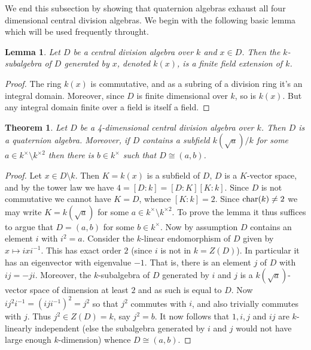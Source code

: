 \documentclass[11pt]{amsart}
\numberwithin{equation}{section}
\newtheorem{theorem}[equation]{Theorem}
\newtheorem{lemma}[equation]{Lemma}
\theoremstyle{remark}
\theoremstyle{remark}
\theoremstyle{remark}
\theoremstyle{definition}
\theoremstyle{definition}
\theoremstyle{definition}
\theoremstyle{definition}
\theoremstyle{definition}
\theoremstyle{definition}
\begin{document}
We end this subsection by showing that quaternion algebras exhaust all four dimensional central division algebras. We begin with the following basic lemma which will be used frequently throught.

\begin{lemma} \label{subfield}
Let $D$ be a central division algebra over $k$ and $ x\in D$. Then the $k$-subalgebra of $D$ generated by $x$, denoted $k(x)$, is a finite field extension of $k$.
\end{lemma}

\begin{proof}
The ring $k(x)$ is commutative, and as a subring of a division ring it's an integral domain. Moreover, since $D$ is finite dimensional over $k$, so is $k(x)$. But any integral domain finite over a field is itself a field.
\end{proof}

\begin{theorem} \label{4 dim div alg}
Let $D$ be a 4-dimensional central division algebra over $k$. Then $D$ is a quaternion algebra. Moreover, if $D$ contains a subfield $k(\sqrt{a})/k$ for some $a\in k^{\times}\setminus k^{\times2}$ then there is $b\in k^{\times}$ such that $D\cong (a,b)$.
\end{theorem}

\begin{proof}
Let $x\in D\setminus k$. Then $K=k(x)$ is a subfield of $D$, $D$ is a $K$-vector space, and by the tower law we have $4=[D:k]=[D:K][K:k]$. Since $D$ is not commutative we cannot have $K=D$, whence $[K:k]=2$. Since $\textup{char}({k})\neq 2$ we may write $K=k(\sqrt{a})$ for some $a\in k^{\times}\setminus k^{\times2}$. To prove the lemma it thus suffices to argue that $D=(a,b)$ for some $b\in k^{\times}$. Now by assumption $D$ contains an element $i$ with $i^2=a$. Consider the $k$-linear endomorphism of $D$  given by $x\mapsto ixi^{-1}$. This has exact order $2$ (since $i$ is not in $k=Z(D)$). In particular it has an eigenvector with eigenvalue $-1$. That is, there is an element $j$ of $D$ with $ij=-ji$. Moreover, the $k$-subalgebra of $D$ generated by $i$ and $j$ is a $k(\sqrt{a})$-vector space of dimension at least $2$ and as such is equal to $D$.  Now $ij^2i^{-1}=(iji^{-1})^2=j^2$ so that $j^2$ commutes with $i$, and also trivially commutes with $j$. Thus $j^2\in Z(D)=k$, say $j^2=b$. It now follows that $1,i,j$ and $ij$ are $k$-linearly independent (else the subalgebra generated by $i$ and $j$ would not have large enough $k$-dimension) whence $D\cong (a,b)$. 
\end{proof}
\end{document}
